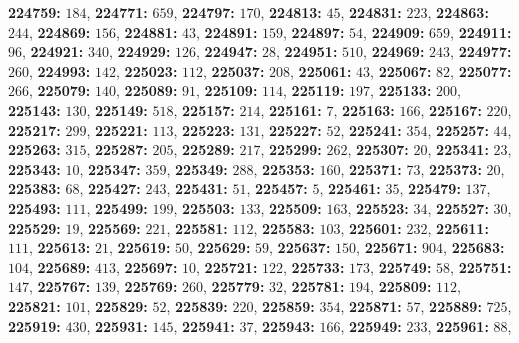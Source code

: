 \textsf{\bfseries 224759:} $184$, \textsf{\bfseries 224771:} $659$, \textsf{\bfseries 224797:} $170$, \textsf{\bfseries 224813:} $45$, \textsf{\bfseries 224831:} $223$, \textsf{\bfseries 224863:} $244$, \textsf{\bfseries 224869:} $156$, \textsf{\bfseries 224881:} $43$, \textsf{\bfseries 224891:} $159$, \textsf{\bfseries 224897:} $54$, \textsf{\bfseries 224909:} $659$, \textsf{\bfseries 224911:} $96$, \textsf{\bfseries 224921:} $340$, \textsf{\bfseries 224929:} $126$, \textsf{\bfseries 224947:} $28$, \textsf{\bfseries 224951:} $510$, \textsf{\bfseries 224969:} $243$, \textsf{\bfseries 224977:} $260$, \textsf{\bfseries 224993:} $142$, \textsf{\bfseries 225023:} $112$, \textsf{\bfseries 225037:} $208$, \textsf{\bfseries 225061:} $43$, \textsf{\bfseries 225067:} $82$, \textsf{\bfseries 225077:} $266$, \textsf{\bfseries 225079:} $140$, \textsf{\bfseries 225089:} $91$, \textsf{\bfseries 225109:} $114$, \textsf{\bfseries 225119:} $197$, \textsf{\bfseries 225133:} $200$, \textsf{\bfseries 225143:} $130$, \textsf{\bfseries 225149:} $518$, \textsf{\bfseries 225157:} $214$, \textsf{\bfseries 225161:} $7$, \textsf{\bfseries 225163:} $166$, \textsf{\bfseries 225167:} $220$, \textsf{\bfseries 225217:} $299$, \textsf{\bfseries 225221:} $113$, \textsf{\bfseries 225223:} $131$, \textsf{\bfseries 225227:} $52$, \textsf{\bfseries 225241:} $354$, \textsf{\bfseries 225257:} $44$, \textsf{\bfseries 225263:} $315$, \textsf{\bfseries 225287:} $205$, \textsf{\bfseries 225289:} $217$, \textsf{\bfseries 225299:} $262$, \textsf{\bfseries 225307:} $20$, \textsf{\bfseries 225341:} $23$, \textsf{\bfseries 225343:} $10$, \textsf{\bfseries 225347:} $359$, \textsf{\bfseries 225349:} $288$, \textsf{\bfseries 225353:} $160$, \textsf{\bfseries 225371:} $73$, \textsf{\bfseries 225373:} $20$, \textsf{\bfseries 225383:} $68$, \textsf{\bfseries 225427:} $243$, \textsf{\bfseries 225431:} $51$, \textsf{\bfseries 225457:} $5$, \textsf{\bfseries 225461:} $35$, \textsf{\bfseries 225479:} $137$, \textsf{\bfseries 225493:} $111$, \textsf{\bfseries 225499:} $199$, \textsf{\bfseries 225503:} $133$, \textsf{\bfseries 225509:} $163$, \textsf{\bfseries 225523:} $34$, \textsf{\bfseries 225527:} $30$, \textsf{\bfseries 225529:} $19$, \textsf{\bfseries 225569:} $221$, \textsf{\bfseries 225581:} $112$, \textsf{\bfseries 225583:} $103$, \textsf{\bfseries 225601:} $232$, \textsf{\bfseries 225611:} $111$, \textsf{\bfseries 225613:} $21$, \textsf{\bfseries 225619:} $50$, \textsf{\bfseries 225629:} $59$, \textsf{\bfseries 225637:} $150$, \textsf{\bfseries 225671:} $904$, \textsf{\bfseries 225683:} $104$, \textsf{\bfseries 225689:} $413$, \textsf{\bfseries 225697:} $10$, \textsf{\bfseries 225721:} $122$, \textsf{\bfseries 225733:} $173$, \textsf{\bfseries 225749:} $58$, \textsf{\bfseries 225751:} $147$, \textsf{\bfseries 225767:} $139$, \textsf{\bfseries 225769:} $260$, \textsf{\bfseries 225779:} $32$, \textsf{\bfseries 225781:} $194$, \textsf{\bfseries 225809:} $112$, \textsf{\bfseries 225821:} $101$, \textsf{\bfseries 225829:} $52$, \textsf{\bfseries 225839:} $220$, \textsf{\bfseries 225859:} $354$, \textsf{\bfseries 225871:} $57$, \textsf{\bfseries 225889:} $725$, \textsf{\bfseries 225919:} $430$, \textsf{\bfseries 225931:} $145$, \textsf{\bfseries 225941:} $37$, \textsf{\bfseries 225943:} $166$, \textsf{\bfseries 225949:} $233$, \textsf{\bfseries 225961:} $88$, 
